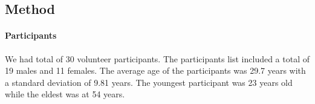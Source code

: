 \subsection{Method}

\paragraph{Participants}

We had total of 30 volunteer participants. The participants list included a total of 19 males and 11 females. 
The average age of the participants was 29.7 years with a standard deviation 
of 9.81 years. The youngest participant was 23 years old while the eldest was 
at 54 years.

